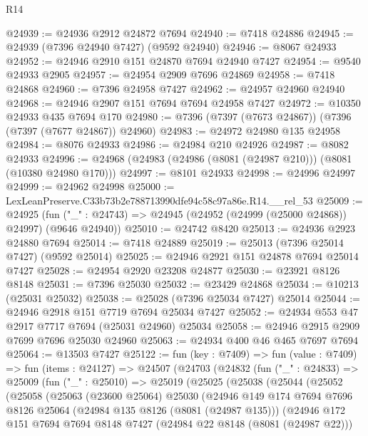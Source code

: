 \begin{lexlean}{R14}
\begin{coremodule}
@24939 := @24936 @2912 @24872 @7694
@24940 := @7418 @24886
@24945 := @24939 (@7396 @24940 @7427) (@9592 @24940)
@24946 := @8067 @24933
@24952 := @24946 @2910 @151 @24870 @7694 @24940 @7427
@24954 := @9540 @24933 @2905
@24957 := @24954 @2909 @7696 @24869
@24958 := @7418 @24868
@24960 := @7396 @24958 @7427
@24962 := @24957 @24960 @24940
@24968 := @24946 @2907 @151 @7694 @7694 @24958 @7427
@24972 := @10350 @24933 @435 @7694 @170
@24980 := @7396 (@7397 (@7673 @24867)) (@7396 (@7397 (@7677 @24867)) @24960)
@24983 := @24972 @24980 @135 @24958
@24984 := @8076 @24933
@24986 := @24984 @210 @24926
@24987 := @8082 @24933
@24996 := @24968 (@24983 (@24986 (@8081 (@24987 @210))) (@8081 (@10380 @24980 @170)))
@24997 := @8101 @24933
@24998 := @24996 @24997
@24999 := @24962 @24998
@25000 := LexLeanPreserve.C33b73b2e788713990dfe94c58c97a86e.R14.__rel_53
@25009 := @24925
    (fun ("_" : @24743) => @24945 (@24952 (@24999 (@25000 @24868)) @24997) (@9646 @24940))
@25010 := @24742 @8420
@25013 := @24936 @2923 @24880 @7694
@25014 := @7418 @24889
@25019 := @25013 (@7396 @25014 @7427) (@9592 @25014)
@25025 := @24946 @2921 @151 @24878 @7694 @25014 @7427
@25028 := @24954 @2920 @23208 @24877
@25030 := @23921 @8126 @8148
@25031 := @7396 @25030
@25032 := @23429 @24868
@25034 := @10213 (@25031 @25032)
@25038 := @25028 (@7396 @25034 @7427) @25014
@25044 := @24946 @2918 @151 @7719 @7694 @25034 @7427
@25052 := @24934 @553 @47 @2917 @7717 @7694 (@25031 @24960) @25034
@25058 := @24946 @2915 @2909 @7699 @7696 @25030 @24960
@25063 := @24934 @400 @46 @465 @7697 @7694
@25064 := @13503 @7427
@25122 := fun (key : @7409) =>
  fun (value : @7409) =>
  fun (items : @24127) =>
  @24507
    (@24703
      (@24832
        (fun ("_" : @24833) =>
        @25009
          (fun ("_" : @25010) =>
          @25019
            (@25025
              (@25038
                (@25044
                  (@25052
                    (@25058
                      (@25063
                        (@23600 @25064)
                        @25030
                        (@24946
                          @149
                          @174
                          @7694
                          @7696
                          @8126
                          @25064
                          (@24984 @135 @8126 (@8081 (@24987 @135)))
                          (@24946
                            @172
                            @151
                            @7694
                            @7694
                            @8148
                            @7427
                            (@24984 @22 @8148 (@8081 (@24987 @22)))

\end{coremodule}
\end{lexlean}
